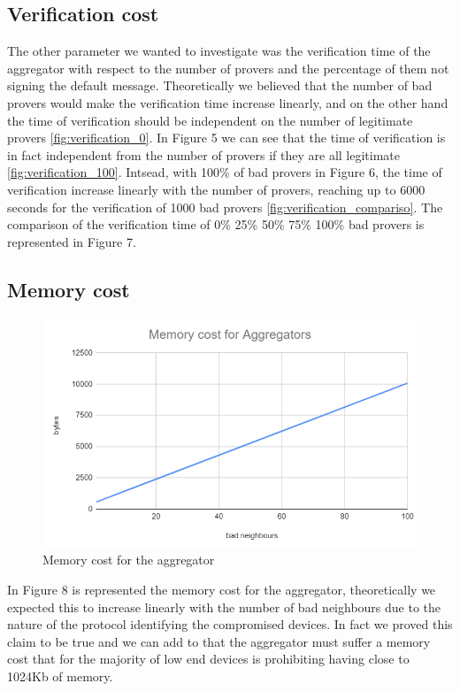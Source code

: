 \subsection{Verification cost}
The other parameter we wanted to investigate was the verification time of the aggregator with respect to the number of provers and the percentage of them not signing the default message.
Theoretically we believed that the number of bad provers would make the verification time increase linearly, and on the other hand the time of verification should be independent on the number of legitimate provers
\ref{fig:verification_0}.
In Figure 5 we can see that the time of verification is in fact independent from the number of provers if they are all legitimate \ref{fig:verification_100}.
Intsead, with 100\% of bad provers in Figure 6, the time of verification increase linearly with the number of provers, reaching up to 6000 seconds for the verification of 1000 bad provers \ref{fig:verification_compariso}.
The comparison of the verification time of 0\% 25\% 50\% 75\% 100\% bad provers is represented in Figure 7.\\

\subsection{Memory cost}
\begin{figure}
	\includegraphics[width=\linewidth]{Images/memorycost.png} %
	\caption{Memory cost for the aggregator } %
\end{figure}
In Figure 8 is represented the memory cost for the aggregator, theoretically we expected this to increase linearly with the number of bad neighbours due to the nature of the protocol identifying the compromised devices. In fact we proved this claim to be true and we can add to that the aggregator must suffer a memory cost that for the majority of low end devices is prohibiting having close to 1024Kb of memory.

